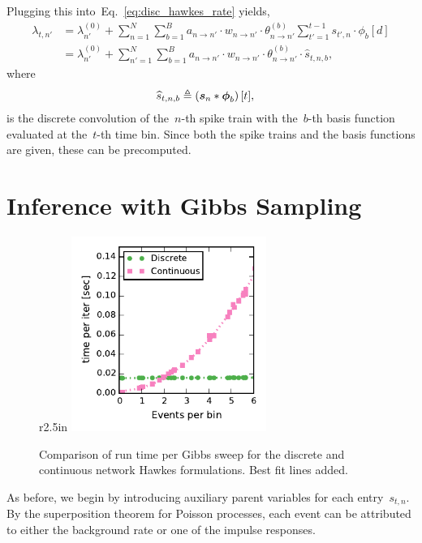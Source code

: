 Plugging this into~Eq.~\ref{eq:disc_hawkes_rate} yields,
\begin{align*}
  \lambda_{t,n'} &=
  \lambda_{n'}^{(0)} +
  \sum_{n = 1}^N  \sum_{b=1}^B a_{n \to n'} \cdot w_{n \to n'} \cdot 
  \theta_{n \to n'}^{(b)} \sum_{t'=1}^{t-1} s_{t',n} \cdot \phi_b[d] \\
  &=
  \lambda_{n'}^{(0)} +
  \sum_{n' = 1}^N  \sum_{b=1}^B a_{n \to n'} \cdot w_{n \to n'} \cdot
  \theta_{n \to n'}^{(b)} \cdot  \widehat{s}_{t,n,b},
\end{align*}
where
\begin{align*}
  \widehat{s}_{t,n,b} &\triangleq \left(\boldsymbol{s}_n \ast \boldsymbol{\phi}_b\right)[t],
\end{align*}
is the discrete convolution of the~$n$-th spike train with
the~$b$-th basis function evaluated at the~$t$-th time bin.
Since both the spike trains and the basis functions are given,
these can be precomputed.


\section{Inference with Gibbs Sampling}

\begin{figure}{r}{2.5in}
  \centering
  \includegraphics[width=2.5in]{figures/ch2b/discrete_cont_comparison}
  \caption[Runtime comparison of continuous and discrete time Hawkes models]{
    Comparison of run time per Gibbs sweep for the discrete and continuous network Hawkes formulations. Best fit lines added.}
  \label{fig:disc_vs_cont}
\end{figure}

As before, we begin by introducing auxiliary parent variables for each
entry~$s_{t,n}$.  By the superposition theorem for Poisson processes,
each event can be attributed to either the background rate or one of
the impulse responses.

